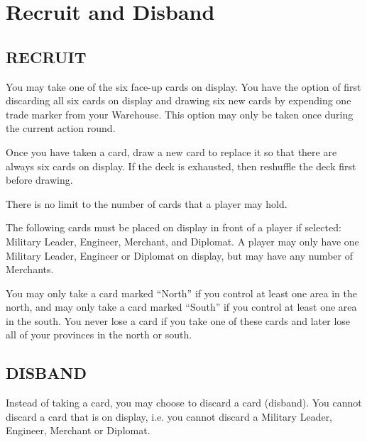 \section{Recruit and Disband}

\subsection{RECRUIT}

You may take one of the six face-up cards on display. You have the option of first discarding all six cards on display and drawing six new cards by expending one trade marker from your Warehouse. This option may only be taken once during the current action round.

Once you have taken a card, draw a new card to replace it so that there are always six cards on display. If the deck is exhausted, then reshuffle the deck first before drawing.

There is no limit to the number of cards that a player may hold.

The following cards must be placed on display in front of a player if selected: Military Leader, Engineer, Merchant, and Diplomat. A player may only have one Military Leader, Engineer or Diplomat on display, but may have any number of Merchants.

You may only take a card marked “North” if you control at least one area in the north, and may only take a card marked “South” if you control at least one area in the south. You never lose a card if you take one of these cards and later lose all of your provinces in the north or south.

\subsection{DISBAND}

Instead of taking a card, you may choose to discard a card (disband). You cannot discard a card that is on display, i.e. you cannot discard a Military Leader, Engineer, Merchant or Diplomat.